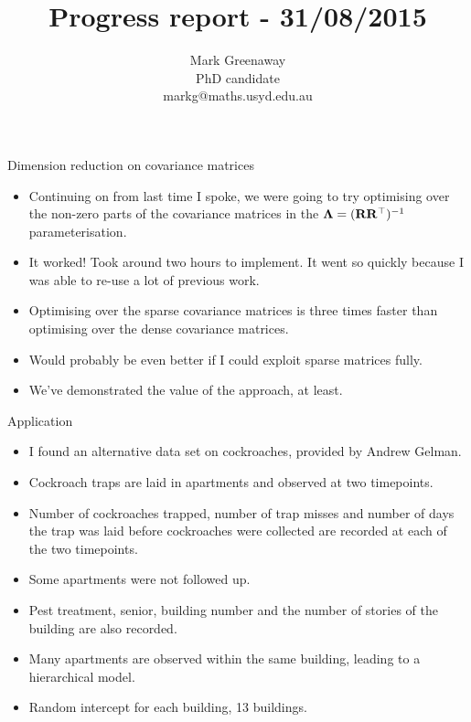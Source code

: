 \documentclass{beamer}
\title{Progress report - 31/08/2015}
\author{Mark Greenaway\\PhD candidate\\markg@maths.usyd.edu.au}
\begin{document}
\begin{frame}
\maketitle
\end{frame}

\begin{frame}{Dimension reduction on covariance matrices}
\begin{itemize}
\item Continuing on from last time I spoke, we were going to try optimising over the non-zero
			parts of the covariance matrices in the ${\boldsymbol \Lambda}=({\bf R} {\bf R}^\top)^{-1}$ parameterisation.
\item It worked! Took around two hours to implement. It went so quickly because I was able
			to re-use a lot of previous work.
\item Optimising over the sparse covariance matrices is three times faster than optimising
		over the dense covariance matrices.
\item Would probably be even better if I could exploit sparse matrices fully.
\item We've demonstrated the value of the approach, at least.
\end{itemize}
\end{frame}

\begin{frame}{Application}
\begin{itemize}
\item I found an alternative data set on cockroaches, provided by Andrew Gelman.
\item Cockroach traps are laid in apartments and observed at two timepoints.
\item Number of cockroaches trapped, number of trap misses and number of days the trap was laid
	  before cockroaches were collected are recorded at each of the two timepoints.
\item Some apartments were not followed up.
\item Pest treatment, senior, building number and the number of stories of the building are also
      recorded.
\item Many apartments are observed within the same building, leading to a hierarchical model.
\item Random intercept for each building, 13 buildings.
\end{itemize}
\end{frame}
\end{document}
